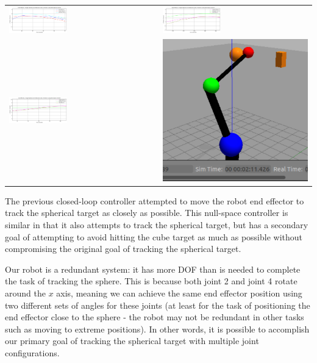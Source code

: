\documentclass[11pt]{article}
\begin{document}
\begin{center}
    \begin{tabular}{ll}
        \includegraphics[width=0.4\textwidth]{images/nullspace_x.png}
        &
        \includegraphics[width=0.4\textwidth]{images/nullspace_y.png} \\
        \includegraphics[width=0.4\textwidth]{images/nullspace_z.png} & \includegraphics[height=0.18\textwidth]{images/nullspace_pic.png}
    \end{tabular}
\end{center}

The previous closed-loop controller attempted to move the robot end effector to track the spherical target as closely as possible. This null-space controller is similar in that it also attempts to track the spherical target, but has a secondary goal of attempting to avoid hitting the cube target as much as possible without compromising the original goal of tracking the spherical target.

Our robot is a redundant system: it has more DOF than is needed to complete the task of tracking the sphere. This is because both joint 2 and joint 4 rotate around the \(x\) axis, meaning we can achieve the same end effector position using two different sets of angles for these joints (at least for the task of positioning the end effector close to the sphere - the robot may not be redundant in other tasks such as moving to extreme positions). In other words, it is possible to accomplish our primary goal of tracking the spherical target with multiple joint configurations.
\end{document}
